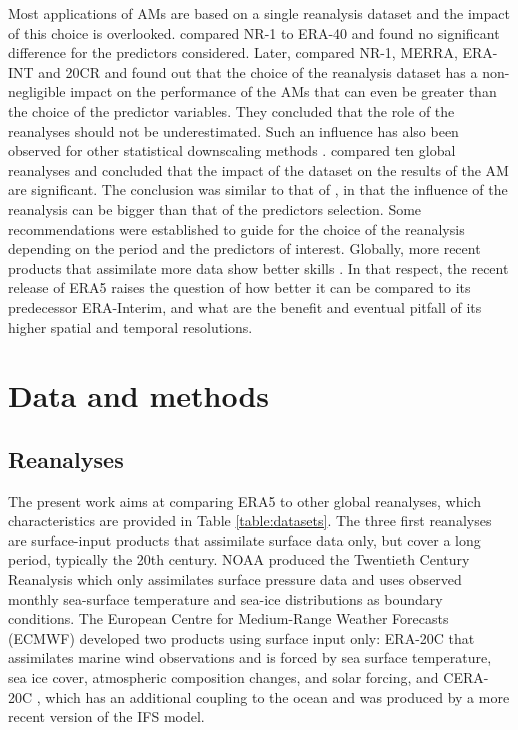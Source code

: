 \documentclass[alpha-refs]{wiley-article}
\begin{document}
Most applications of AMs are based on a single reanalysis dataset and the impact of this choice is overlooked. \citet{BenDaoud2009} compared NR-1 to ERA-40 and found no significant difference for the predictors considered. Later, \citet{Dayon2015} compared NR-1, MERRA, ERA-INT and 20CR and found out that the choice of the reanalysis dataset has a non-negligible impact on the performance of the AMs that can even be greater than the choice of the predictor variables. They concluded that the role of the reanalyses should not be underestimated. Such an influence has also been observed for other statistical downscaling methods \citep[e.g.][]{Koukidis2009}. \citet{Horton2018b} compared ten global reanalyses and concluded that the impact of the dataset on the results of the AM are significant. The conclusion was similar to that of \citet{Dayon2015}, in that the influence of the reanalysis can be bigger than that of the predictors selection. Some recommendations were established to guide for the choice of the reanalysis depending on the period and the predictors of interest. Globally, more recent products that assimilate more data show better skills \citep{Horton2018b}. In that respect, the recent release of ERA5 \citep{Hersbach2019} raises the question of how better it can be compared to its predecessor ERA-Interim, and what are the benefit and eventual pitfall of its higher spatial and temporal resolutions.


\section{Data and methods}

\subsection{Reanalyses}

The present work aims at comparing ERA5 \citep{Hersbach2019} to other global reanalyses, which characteristics are provided in Table \ref{table:datasets}. The three first reanalyses are surface-input \citep{Fujiwara2017} products that assimilate surface data only, but cover a long period, typically the 20th century. NOAA produced the Twentieth Century Reanalysis \citep[version 2c, 20CR-2c --][]{Compo2011} which only assimilates surface pressure data and uses observed monthly sea-surface temperature and sea-ice distributions as boundary conditions. The European Centre for Medium-Range Weather Forecasts (ECMWF) developed two products using surface input only: ERA-20C \citep{Poli2016} that assimilates marine wind observations and is forced by sea surface temperature, sea ice cover, atmospheric composition changes, and solar forcing, and CERA-20C \citep{Laloyaux2018a}, which has an additional coupling to the ocean and was produced by a more recent version of the IFS model.
\end{document}

